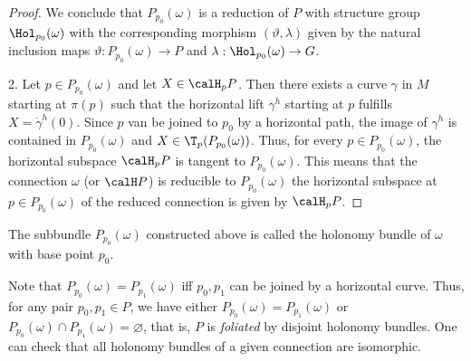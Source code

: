 \begin{proof}
    We conclude that $P_{p_0}(\omega)$ is a reduction of $P$ with structure group $\Hol_{p_0}(\omega)$ with the corresponding morphism $(\vartheta,\lambda)$ given by the natural inclusion maps $\vartheta:P_{p_0}(\omega)\to P$ and $\lambda:\Hol_{p_0}(\omega)\to G$.

    2. Let $p\in P_{p_0}(\omega)$ and let $X\in\calH_p P$. Then there exists a curve $\gamma$ in $M$ starting at $\pi(p)$ such that the horizontal lift $\gamma^h$ starting at $p$ fulfills $X=\dot\gamma^h(0)$. Since $p$ van be joined to $p_0$ by a horizontal path, the image of $\gamma^h$ is contained in $P_{p_0}(\omega)$ and $X\in \T_p(P_{p_0}(\omega))$. Thus, for every $p\in P_{p_0}(\omega)$, the horizontal subspace $\calH_p P$ is tangent to $P_{p_0}(\omega)$. This means that the connection $\omega$ (or $\calH P$) is reducible to $P_{p_0}(\omega)$ the horizontal subspace at $p\in P_{p_0}(\omega)$ of the reduced connection is given by $\calH_p P$.
\end{proof}

\begin{defn}
    The subbundle $P_{p_0}(\omega)$ constructed above is called the holonomy bundle of $\omega$ with base point $p_0$.
\end{defn}

Note that $P_{p_0}(\omega)=P_{p_1}(\omega)$ iff $p_0,p_1$ can be joined by a horizontal curve. Thus, for any pair $p_0,p_1\in P$, we have either $P_{p_0}(\omega)=P_{p_1}(\omega)$ or $P_{p_0}(\omega)\cap P_{p_1}(\omega)=\varnothing$, that is, $P$ is \emph{foliated} by disjoint holonomy bundles. One can check that all holonomy bundles of a given connection are isomorphic.

